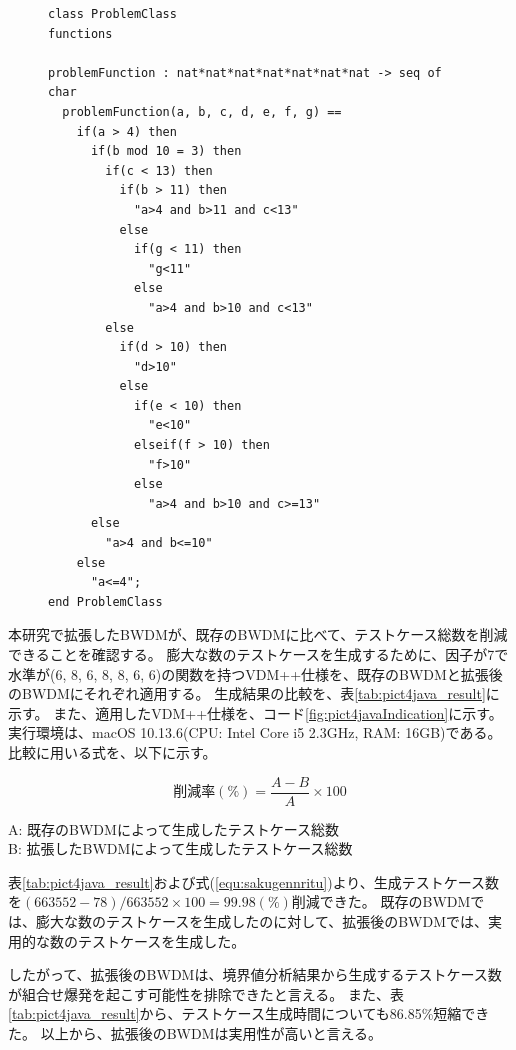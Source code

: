 \documentclass[uplatex, report, a4j, 10pt]{jsbook}
\begin{document}
\lstset{language=}
\begin{figure}[tp]
  \begin{lstlisting}[caption={因子が7で水準が$(6, 8, 6, 8, 8, 6, 6)$の関数を持つVDM++仕様},label=fig:pict4javaIndication]
class ProblemClass
functions

problemFunction : nat*nat*nat*nat*nat*nat*nat -> seq of char
  problemFunction(a, b, c, d, e, f, g) ==
    if(a > 4) then
      if(b mod 10 = 3) then
        if(c < 13) then
          if(b > 11) then
            "a>4 and b>11 and c<13"
          else
            if(g < 11) then
              "g<11"
            else
              "a>4 and b>10 and c<13"
        else
          if(d > 10) then
            "d>10"
          else
            if(e < 10) then
              "e<10"
            elseif(f > 10) then
              "f>10"
            else
              "a>4 and b>10 and c>=13"
      else
        "a>4 and b<=10"
    else
      "a<=4";
end ProblemClass
\end{lstlisting}
\end{figure}

本研究で拡張したBWDMが、既存のBWDMに比べて、テストケース総数を削減できることを確認する。
膨大な数のテストケースを生成するために、因子が7で水準が(6, 8, 6, 8, 8, 6, 6)の関数を持つVDM++仕様を、既存のBWDMと拡張後のBWDMにそれぞれ適用する。
生成結果の比較を、表\ref{tab:pict4java_result}に示す。
また、適用したVDM++仕様を、コード\ref{fig:pict4javaIndication}に示す。
実行環境は、macOS 10.13.6(CPU: Intel Core i5 2.3GHz, RAM: 16GB)である。
比較に用いる式を、以下に示す。

\begin{equation}\label{equ:sakugennritu}
  削減率(\%) = \frac{A - B}{A} \times 100
\end{equation}

\begin{center}
  A: 既存のBWDMによって生成したテストケース総数\\
  B: 拡張したBWDMによって生成したテストケース総数\\
\end{center}

表\ref{tab:pict4java_result}および式(\ref{equ:sakugennritu})より、生成テストケース数を$(663552-78)/663552 \times 100=99.98(\%)$削減できた。
既存のBWDMでは、膨大な数のテストケースを生成したのに対して、拡張後のBWDMでは、実用的な数のテストケースを生成した。

したがって、拡張後のBWDMは、境界値分析結果から生成するテストケース数が組合せ爆発を起こす可能性を排除できたと言える。
また、表\ref{tab:pict4java_result}から、テストケース生成時間についても86.85\%短縮できた。
以上から、拡張後のBWDMは実用性が高いと言える。
\end{document}
